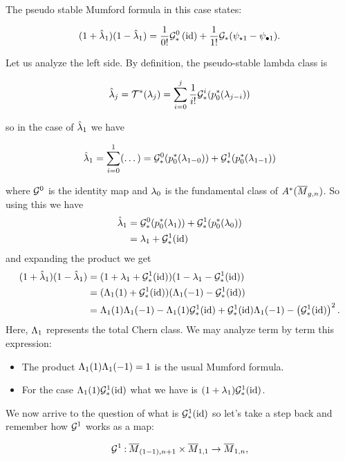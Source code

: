 \documentclass[12pt]{memoir}
\begin{document}
\begin{Ex}
    The pseudo stable Mumford formula in this case states:

    \[(1+\hat{\lambda}_1)(1-\hat{\lambda}_1)=\frac{1}{0!}\mathcal{G}_\ast^0\left(\operatorname{id}\right)+\frac{1}{1!}\mathcal{G}_\ast(\psi_{\star 1}-\psi_{\bullet 1}).\]

    Let us analyze the left side. By definition, the pseudo-stable lambda class is

    \[\hat{\lambda}_j=\mathcal{T}^\ast(\lambda_j)=\sum_{i=0}^j\frac{1}{i!}\mathcal{G}_\ast^i(p_0^\ast(\lambda_{j-i}))\]

    so in the case of \(\hat{\lambda}_1\) we have

    \[\hat{\lambda}_1=\sum_{i=0}^1(\dots)=\mathcal{G}_\ast^0(p_0^\ast(\lambda_{1-0}))+\mathcal{G}_\ast^1(p_0^\ast(\lambda_{1-1}))\]

    where \(\mathcal{G}^0\) is the identity map and \(\lambda_0\) is the fundamental class of \(A^\ast(\overline M_{g,n})\). So using this we have
    \begin{align*}
        \hat{\lambda}_1 & =\mathcal{G}_\ast^0(p_0^\ast(\lambda_{1}))+\mathcal{G}_\ast^1(p_0^\ast(\lambda_{0})) \\
                  & =\lambda_1+\mathcal{G}_\ast^1(\operatorname{id})
    \end{align*}
    and expanding the product we get
    \begin{align*}
        (1+\hat{\lambda}_1)(1-\hat{\lambda}_1) & =(1+\lambda_1+\mathcal{G}_\ast^1(\operatorname{id}))(1-\lambda_1-\mathcal{G}_\ast^1(\operatorname{id}))                                                 \\
                                       & =(\Lambda_1(1)+\mathcal{G}_\ast^1(\operatorname{id}))(\Lambda_1(-1)-\mathcal{G}_\ast^1(\operatorname{id}))                                              \\
                                       & =\Lambda_1(1)\Lambda_1(-1)-\Lambda_1(1)\mathcal{G}_\ast^1(\operatorname{id})+\mathcal{G}_\ast^1(\operatorname{id})\Lambda_1(-1)-\left(\mathcal{G}_\ast^1(\operatorname{id})\right)^2.
    \end{align*}
    Here, \(\Lambda_1\) represents the total Chern class. We may analyze term by term this expression:
    \begin{itemize}
        \item The product \(\Lambda_1(1)\Lambda_1(-1)=1\) is the usual Mumford formula.
        \item For the case \(\Lambda_1(1)\mathcal{G}_\ast^1(\operatorname{id})\) what we have is \((1+\lambda_1)\mathcal{G}_\ast^1(\operatorname{id})\).
    \end{itemize}
    We now arrive to the question of what is \(\mathcal{G}_\ast^1(\operatorname{id})\) so let's take a step back and remember how \(\mathcal{G}^1\) works as a map:

    \[\mathcal{G}^1\mathbin{:} \overline M_{(1-1),n+1}\times\overline M_{1,1}\to \overline M_{1,n},\]


\end{Ex}
\end{document}
